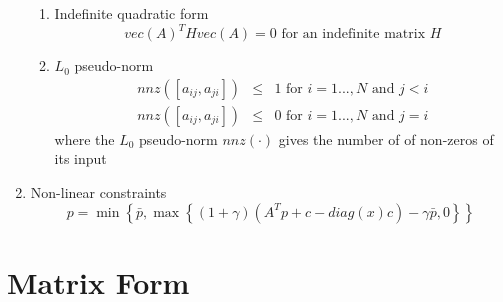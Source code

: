 \documentclass{article}
\begin{document}
\begin{enumerate}
\begin{enumerate}
\item Indefinite quadratic form%
\begin{equation*}
vec\left( A\right) ^{T}Hvec\left( A\right) =0\text{ for an indefinite matrix 
}H
\end{equation*}

\item $L_{0}$ pseudo-norm%
\begin{eqnarray*}
nnz\left( \left[ a_{ij},a_{ji}\right] \right) &\leq &1\text{ for }i=1...,N%
\text{ and }j<i \\
nnz\left( \left[ a_{ij},a_{ji}\right] \right) &\leq &0\text{ for }i=1...,N%
\text{ and }j=i
\end{eqnarray*}%
where the $L_{0}$ pseudo-norm $nnz\left( \cdot \right) $ gives the number of
of non-zeros of its input
\end{enumerate}

\item Non-linear constraints%
\begin{equation*}
p=\min \left\{ \bar{p},\max \left\{ \left( 1+\gamma \right) \left(
A^{T}p+c-diag\left( x\right) c\right) -\gamma \bar{p},0\right\} \right\} 
\end{equation*}
\end{enumerate}

\section{Matrix Form}
\end{document}
